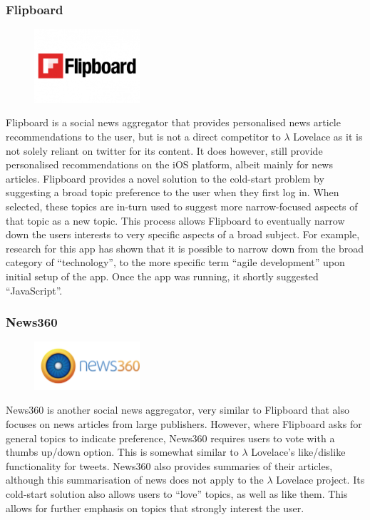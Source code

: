 \documentclass{article}
\begin{document}
\subsubsection*{Flipboard}

\begin{figure}[H]
    \includegraphics[width=0.35\textwidth, center]{flipboard_logo}
\end{figure}

Flipboard is a social news aggregator that provides personalised news article recommendations to the user, but is not a direct competitor to $\lambda$ Lovelace as it is not solely reliant on twitter for its content. It does however, still provide personalised recommendations on the iOS platform, albeit mainly for news articles. Flipboard provides a novel solution to the cold-start problem by suggesting a broad topic preference to the user when they first log in. When selected, these topics  are in-turn used to suggest more narrow-focused aspects of that topic as a new topic. This process allows Flipboard to eventually narrow down the users interests to very specific aspects of a broad subject. For example, research for this app has shown that it is possible to narrow down from the broad category of “technology”, to the more specific term “agile development” upon initial setup of the app. Once the app was running, it shortly suggested “JavaScript”.

\subsubsection*{News360}

\begin{figure}[H]
    \includegraphics[width=0.35\textwidth, center]{news360_logo}
\end{figure}

News360 is another social news aggregator, very similar to Flipboard that also focuses on news articles from large publishers. However, where Flipboard asks for general topics to indicate preference,  News360 requires users to vote with a thumbs up/down option. This is somewhat similar to $\lambda$ Lovelace's like/dislike functionality for tweets. News360 also provides summaries of their articles, although this summarisation of news does not apply to the $\lambda$ Lovelace project. Its cold-start solution also allows users to “love” topics, as well as like them. This allows for further emphasis on topics that strongly interest the user.
\end{document}
